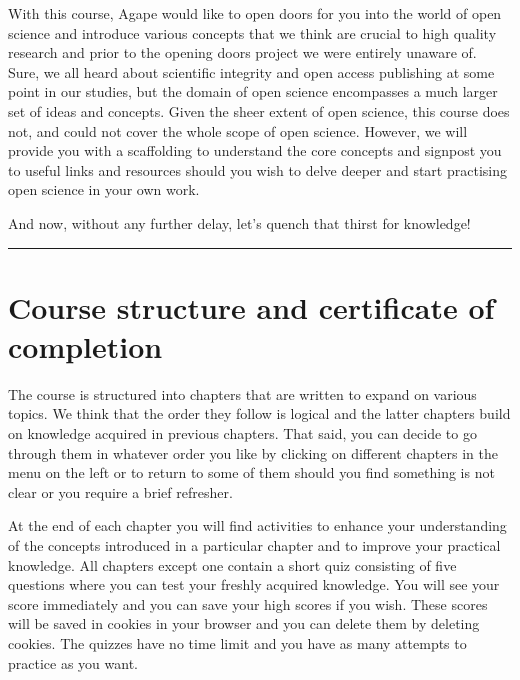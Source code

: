 \documentclass[
]{book}
\begin{document}
With this course, Agape would like to open doors for you into the world of open science and introduce various concepts that we think are crucial to high quality research and prior to the opening doors project we were entirely unaware of. Sure, we all heard about scientific integrity and open access publishing at some point in our studies, but the domain of open science encompasses a much larger set of ideas and concepts. Given the sheer extent of open science, this course does not, and could not cover the whole scope of open science. However, we will provide you with a scaffolding to understand the core concepts and signpost you to useful links and resources should you wish to delve deeper and start practising open science in your own work.

And now, without any further delay, let's quench that thirst for knowledge!

\begin{center}\rule{0.5\linewidth}{0.5pt}\end{center}

\hypertarget{course-structure-and-certificate-of-completion}{%
\section*{Course structure and certificate of completion}\label{course-structure-and-certificate-of-completion}}

The course is structured into chapters that are written to expand on various topics. We think that the order they follow is logical and the latter chapters build on knowledge acquired in previous chapters. That said, you can decide to go through them in whatever order you like by clicking on different chapters in the menu on the left or to return to some of them should you find something is not clear or you require a brief refresher.

At the end of each chapter you will find activities to enhance your understanding of the concepts introduced in a particular chapter and to improve your practical knowledge. All chapters except one contain a short quiz consisting of five questions where you can test your freshly acquired knowledge. You will see your score immediately and you can save your high scores if you wish. These scores will be saved in cookies in your browser and you can delete them by deleting cookies. The quizzes have no time limit and you have as many attempts to practice as you want.
\end{document}
